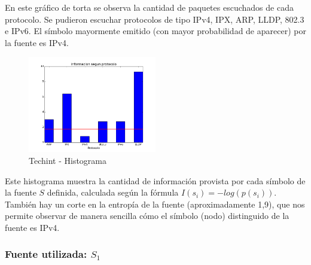 \documentclass[final,narroweqnarray,inline]{ieee}
\begin{document}


En este gráfico de torta se observa la cantidad de paquetes escuchados de cada
protocolo. Se pudieron escuchar protocolos de tipo IPv4, IPX, ARP, LLDP,
802.3 e IPv6. El símbolo mayormente emitido (con mayor probabilidad de
aparecer) por la fuente es IPv4.

\begin{figure}
\begin{center}
  \includegraphics[width=0.5\textwidth]{graficos/techint_histogram.png}
  \caption{Techint - Histograma}
  \label{techint-pie}
\end{center}
\end{figure}

Este histograma muestra la cantidad de información provista por cada símbolo
de la fuente $S$ definida, calculada según la fórmula $ I(s_{i}) =
-log(p(s_{i}))  $. También hay un corte en la entropía de la fuente
(aproximadamente 1,9), que nos permite observar de manera sencilla cómo el símbolo (nodo)
distinguido de la fuente es IPv4.

\subsubsection{Fuente utilizada: $S_{1}$}
\end{document}
